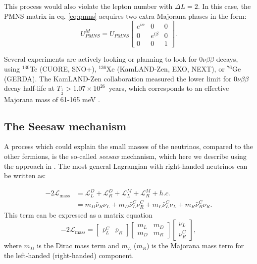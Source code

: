 This process would also violate the lepton number with $\Delta L = 2$. In this case, the PMNS matrix in eq. \eqref{eq:pmns} acquires two extra Majorana phases in the form:
\begin{equation}
    U_{PMNS}^M = U_{PMNS} \begin{bmatrix}
    e^{i\alpha} & 0 & 0 \\
    0 & e^{i\beta} & 0 \\
    0 & 0 & 1
    \end{bmatrix}.
\end{equation}

Several experiments are actively looking or planning to look for $0\nu\beta\beta$ decays, using $^{130}$Te (CUORE, SNO+), $^{136}$Xe (KamLAND-Zen, EXO, NEXT), or $^{76}$Ge (GERDA). 
The KamLAND-Zen collaboration measured the lower limit for $0\nu\beta\beta$ decay half-life at $T_{\frac{1}{2}} > 1.07\times10^{26}$~years, which corresponds to an effective Majorana mass of 61-165 meV \cite{KamLAND-Zen:2016pfg}.

\subsection{The Seesaw mechanism}\label{sec:seesaw}
A process which could explain the small masses of the neutrinos, compared to the other fermions, is the so-called \emph{seesaw} mechanism, which here we describe using the approach in \cite{Grossman:2003eb}. 
The most general Lagrangian with right-handed neutrinos can be written as:

\begin{align}
    -2\mathcal{L}_{\mathrm{mass}} & = \mathcal{L}^D_L + \mathcal{L}^D_R + \mathcal{L}^M_L + \mathcal{L}^M_R + h.c. \\
    & = m_D \bar{\nu}_R \nu_L + m_D \bar{\nu}^C_L\nu^C_R + m_L\bar{\nu}_L^C\nu_L + m_R \bar{\nu}_R^C\nu_R.
\end{align}
This term can be expressed as a matrix equation 
\begin{equation}
    -2\mathcal{L_\mathrm{mass}} = \begin{bmatrix}
    \bar{\nu}_L^C & \bar{\nu}_R
    \end{bmatrix}\begin{bmatrix}
    m_L & m_D \\
    m_D & m_R
    \end{bmatrix}\begin{bmatrix}
    \nu_L \\ \nu_R^C
    \end{bmatrix},
\end{equation}
where $m_D$ is the Dirac mass term and $m_L$ ($m_R$) is the Majorana mass term for the left-handed (right-handed) component. 

